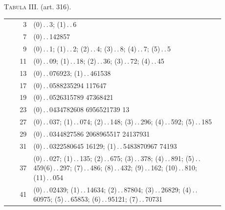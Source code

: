 \begin{center}\textsc{Tabula III.} (art. 316).\end{center}
\begingroup\small\setlength{\tabcolsep}{5pt}\renewcommand{\arraystretch}{1.0}\setlength{\LTpre}{0pt}
\begin{longtable}{r||>{\raggedright\arraybackslash}p{0.88\linewidth}}\hline
3 & \mbox{(0)\,.\,.\,}\mbox{3}; \mbox{(1)\,.\,.\,}\mbox{6}\\
7 & \mbox{(0)\,.\,.\,}\mbox{142857}\\
9 & \mbox{(0)\,.\,.\,}\mbox{1}; \mbox{(1)\,.\,.\,}\mbox{2}; \mbox{(2)\,.\,.\,}\mbox{4}; \mbox{(3)\,.\,.\,}\mbox{8}; \mbox{(4)\,.\,.\,}\mbox{7}; \mbox{(5)\,.\,.\,}\mbox{5}\\
11 & \mbox{(0)\,.\,.\,}\mbox{09}; \mbox{(1)\,.\,.\,}\mbox{18}; \mbox{(2)\,.\,.\,}\mbox{36}; \mbox{(3)\,.\,.\,}\mbox{72}; \mbox{(4)\,.\,.\,}\mbox{45}\\
13 & \mbox{(0)\,.\,.\,}\mbox{076923}; \mbox{(1)\,.\,.\,}\mbox{461538}\\
17 & \mbox{(0)\,.\,.\,}\mbox{0588235294} \mbox{117647}\\
19 & \mbox{(0)\,.\,.\,}\mbox{0526315789} \mbox{47368421}\\
23 & \mbox{(0)\,.\,.\,}\mbox{0434782608} \mbox{6956521739} \mbox{13}\\
27 & \mbox{(0)\,.\,.\,}\mbox{037}; \mbox{(1)\,.\,.\,}\mbox{074}; \mbox{(2)\,.\,.\,}\mbox{148}; \mbox{(3)\,.\,.\,}\mbox{296}; \mbox{(4)\,.\,.\,}\mbox{592}; \mbox{(5)\,.\,.\,}\mbox{185}\\
29 & \mbox{(0)\,.\,.\,}\mbox{0344827586} \mbox{2068965517} \mbox{24137931}\\
31 & \mbox{(0)\,.\,.\,}\mbox{0322580645} \mbox{16129}; \mbox{(1)\,.\,.\,}\mbox{5483870967} \mbox{74193}\\
37 & \mbox{(0)\,.\,.\,}\mbox{027}; \mbox{(1)\,.\,.\,}\mbox{135}; \mbox{(2)\,.\,.\,}\mbox{675}; \mbox{(3)\,.\,.\,}\mbox{378}; \mbox{(4)\,.\,.\,}\mbox{891}; \mbox{(5)\,.\,.\,}\mbox{459}\newline \mbox{(6)\,.\,.\,}\mbox{297}; \mbox{(7)\,.\,.\,}\mbox{486}; \mbox{(8)\,.\,.\,}\mbox{432}; \mbox{(9)\,.\,.\,}\mbox{162}; \mbox{(10)\,.\,.\,}\mbox{810}; \mbox{(11)\,.\,.\,}\mbox{054}\\
41 & \mbox{(0)\,.\,.\,}\mbox{02439}; \mbox{(1)\,.\,.\,}\mbox{14634}; \mbox{(2)\,.\,.\,}\mbox{87804}; \mbox{(3)\,.\,.\,}\mbox{26829}; \mbox{(4)\,.\,.\,}\mbox{60975}; \mbox{(5)\,.\,.\,}\mbox{65853}; \mbox{(6)\,.\,.\,}\mbox{95121}; \mbox{(7)\,.\,.\,}\mbox{70731}\\

\end{longtable}
